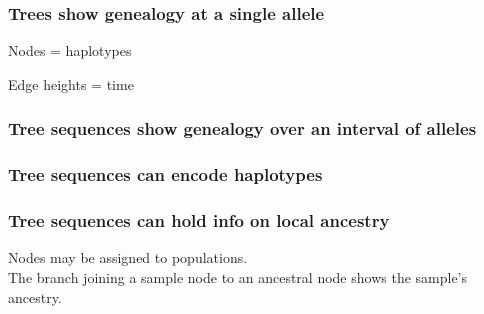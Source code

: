 \documentclass[11pt, mathserif, aspectratio=169]{beamer}
\newcommand{\magenta}[1]{\textcolor{magenta}{#1}}
\newenvironment{wideitemize}{\itemize\addtolength{\itemsep}{10pt}}{\enditemize}
\begin{document}
\begin{frame}
\frametitle{Trees show genealogy at a single allele}
\begin{minipage}{.48\textwidth}
\begin{center}

\end{center}
\end{minipage}\hfill
\begin{minipage}{.48\textwidth}
\begin{wideitemize}
\item Nodes = haplotypes
\item Edge heights = time
\end{wideitemize}
\end{minipage}
\end{frame}

\begin{frame}
\frametitle{Tree sequences show genealogy over an interval of alleles}
\begin{center}

\end{center}
\end{frame}

\begin{frame}
\frametitle{Tree sequences can encode haplotypes}
\begin{center}

\end{center}
\end{frame}

\begin{frame}
\frametitle{Tree sequences can hold info on local ancestry}
\begin{minipage}{.38\textwidth}
\begin{center}

\end{center}
\end{minipage}\hfill
\begin{minipage}{.58\textwidth}
Nodes may be assigned to populations.\\
The branch joining a sample node to an ancestral node shows the sample's ancestry.
\end{minipage}
\end{frame}
\end{document}
